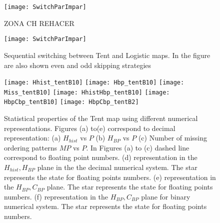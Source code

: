 \begin{figure}
	\texttt{[image: SwitchParImpar]}
	\caption{ZONA CH REHACER} \label{fig:plane zone}
\end{figure}
%
\begin{figure}
	\texttt{[image: SwitchParImpar]}
	\caption{Sequential switching between Tent and Logistic maps. In the figure are also shown even and odd skipping strategies} \label{fig:seq}
\end{figure}
\begin{figure}
	\texttt{[image: Hhist\_tentB10]}
	\texttt{[image: Hbp\_tentB10]}
	\texttt{[image: Miss\_tentB10]}
	\texttt{[image: HhistHbp\_tentB10]}
	\texttt{[image: HbpCbp\_tentB10]}
	\texttt{[image: HbpCbp\_tentB2]}
	\caption{Statistical properties of the Tent map using different numerical representations. Figures (a) to(e) correspond to decimal representation: (a) $H_{hist}$ vs $P$ (b) $H_{BP}$ vs $P$ (c) Number of missing ordering patterns $MP$ vs $P$. In Figures (a) to (c) dashed line correspond to floating point numbers. (d) representation in the $H_{hist},H_{BP}$ plane in the the decimal numerical system.  The star represents the state for floating points numbers. (e) representation in the $H_{BP},C_{BP}$ plane.  The star represents the state for floating points numbers. (f) representation in the $H_{BP},C_{BP}$ plane for binary numerical system.  The star represents the state for floating points numbers. } \label{fig:tent}
\end{figure}

